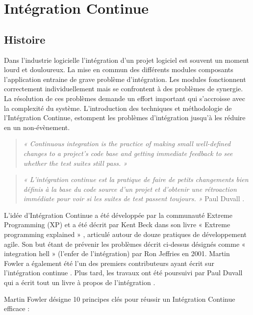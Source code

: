 \documentclass{report}
\begin{document}
  \chapter{Intégration Continue}

    \section{Histoire}
    Dans l’industrie logicielle l’intégration d’un projet logiciel est souvent un moment lourd et douloureux. La mise en commun des différents modules composants l’application entraine de grave problème d’intégration. Les modules fonctionnent correctement individuellement mais se confrontent à des problèmes de synergie. La résolution de ces problèmes demande un effort important qui s’accroisse avec la complexité du système. L’introduction des techniques et méthodologie de l’Intégration Continue, estompent les problèmes d’intégration jusqu’à les réduire en un non-évènement.\\

    \begin{quotation}
      \emph{« Continuous integration is the practice of making small well-defined changes to a project’s code base and getting immediate feedback to see whether the test suites still pass. »}
    \end{quotation}

    \begin{quotation}
      \emph{« L'intégration continue est la pratique de faire de petits changements bien définis à la base du code source d'un projet et d'obtenir une rétroaction immédiate pour voir si les suites de test passent toujours. »} Paul Duvall \cite{Duv07}.\\
    \end{quotation}

    L’idée d'Intégration Continue a été développée par la communauté Extreme Programming (XP) et a été décrit par Kent Beck dans son livre « Extreme programming explained » \cite{Bec99}, articulé autour de douze pratiques de développement agile. Son but étant de prévenir les problèmes décrit ci-dessus désignés comme « integration hell » (l’enfer de l’intégration) par Ron Jeffries en 2001. Martin Fowler a également été l'un des premiers contributeurs ayant écrit sur l’intégration continue \cite{Fow00}. Plus tard, les travaux ont été poursuivi par Paul Duvall qui a écrit tout un livre à propos de l’intégration \cite{Duv07}.

    Martin Fowler \cite{Fow00} désigne 10 principes clés pour réussir un Intégration Continue efficace :\\
\end{document}
